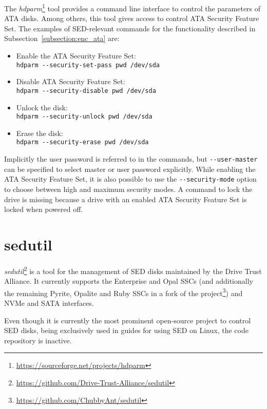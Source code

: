 The \emph{hdparm}\footnote{\url{https://sourceforge.net/projects/hdparm}} tool provides a command line interface to control the parameters of ATA disks. Among others, this tool gives access to control ATA Security Feature Set.
The examples of SED-relevant commands for the functionality described in Subsection~\ref{subsection:enc_ata} are:
\begin{itemize}
\item Enable the ATA Security Feature Set:\\ \verb|hdparm --security-set-pass pwd /dev/sda|
\item Disable ATA Security Feature Set:\\ \verb|hdparm --security-disable pwd /dev/sda|
\item Unlock the disk:\\ \verb|hdparm --security-unlock pwd /dev/sda|
\item Erase the disk:\\ \verb|hdparm --security-erase pwd /dev/sda|
\end{itemize}
Implicitly the user password is referred to in the commands, but \verb|--user-master| can be specified to select master or user password explicitly. While enabling the ATA Security Feature Set, it is also possible to use the \verb|--security-mode| option to choose between high and maximum security modes.
A command to lock the drive is missing because a drive with an enabled ATA Security Feature Set is locked when powered off.


\section{sedutil}

\emph{sedutil}\footnote{\url{https://github.com/Drive-Trust-Alliance/sedutil}} is a tool for the management of SED disks maintained by the Drive Trust Alliance.
It currently supports the Enterprise and Opal SSCs (and additionally the remaining Pyrite, Opalite and Ruby SSCs in a fork of the project\footnote{\url{https://github.com/ChubbyAnt/sedutil}}) and NVMe and SATA interfaces.

Even though it is currently the most prominent open-source project to control SED disks, being exclusively used in guides for using SED on Linux, the code repository is inactive.


